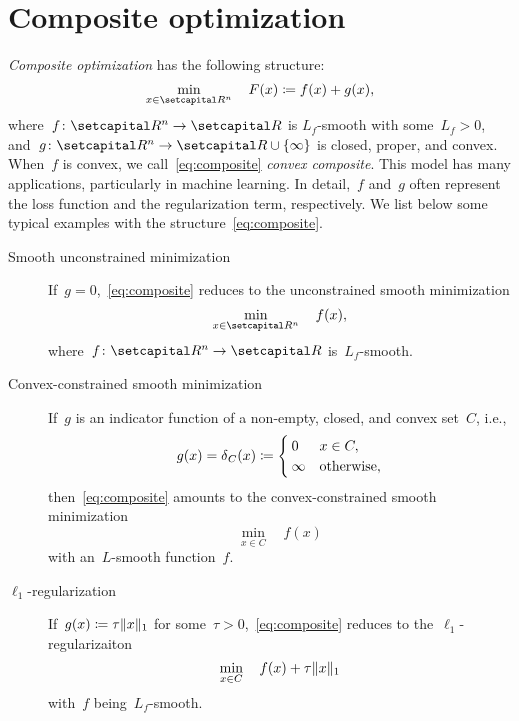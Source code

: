\documentclass[../../main]{subfiles}
\begin{document}
\section{Composite optimization} \label{sec:intro:composite}
\emph{Composite optimization} has the following structure:
\[ \label{eq:composite}
    \min_{x \in \setR^n} \quad F(x) \coloneqq f(x) + g(x)
,\] 
where~$f \colon \setR^n \to \setR$ is $L_f$-smooth with some~$L_f > 0$, and~$g \colon \setR^n \to \setR \cup \set{\infty}$ is closed, proper, and convex.
When~$f$ is convex, we call~\cref{eq:composite} \emph{convex composite}.
This model has many applications, particularly in machine learning.
In detail,~$f$ and~$g$ often represent the loss function and the regularization term, respectively.
We list below some typical examples with the structure~\cref{eq:composite}.

\begin{example} \label{ex:composite}
    \begin{description}
        \item[Smooth unconstrained minimization] If~$g = 0$,~\cref{eq:composite} reduces to the unconstrained smooth minimization
            \[
                \min_{x \in \setR^n} \quad f(x)
            ,\] 
            where~$f \colon \setR^n \to \setR$ is~$L_f$-smooth.
        \item[Convex-constrained smooth minimization] If~$g$ is an indicator function of a non-empty, closed, and convex set~$C$, i.e.,
            \[ \label{eq:indicator}
                g(x) = \operatorname{\delta}_C(x) \coloneqq
                \begin{cases}
                    0 & x \in C, \\
                    \infty & \text{otherwise},
                \end{cases}
            \] 
            then~\cref{eq:composite} amounts to the convex-constrained smooth minimization
            \[
                \min_{x \in C} \quad f(x)
            \] 
            with an~$L$-smooth function~$f$.
        \item[$\ell_1$-regularization] If~$g(x) \coloneqq \tau \lVert x\rVert_1$ for some~$\tau > 0$,~\cref{eq:composite} reduces to the~$\ell_1$-regularizaiton
            \[
                \min_{x \in C} \quad f(x) + \tau \lVert x\rVert_1
            \] 
            with~$f$ being~$L_f$-smooth.
    \end{description}
\end{example}




\end{document}
